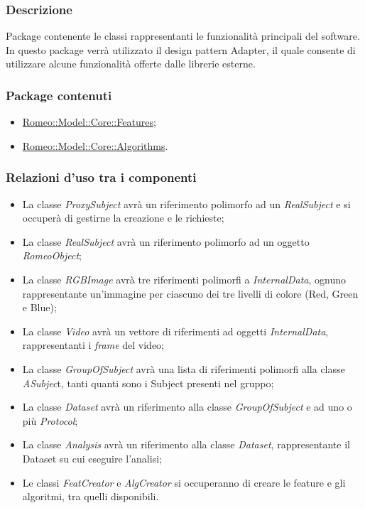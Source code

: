 		\subsubsection{Descrizione}
		Package\g{} contenente le classi rappresentanti le funzionalità principali del software. In questo package\g{} verrà utilizzato il design pattern\g{} Adapter, il quale consente di utilizzare alcune funzionalità offerte dalle librerie esterne.
		\subsubsection{Package contenuti}
		\begin{itemize}
				\item \hyperref[romeo::model::core::features]{Romeo::Model::Core::Features};
				\item \hyperref[romeo::model::core::algorithms]{Romeo::Model::Core::Algorithms}.
		\end{itemize}
		
		\subsubsection{Relazioni d'uso tra i componenti}
		\begin{itemize}
			\item La classe \textsl{ProxySubject} avrà un riferimento polimorfo ad un \textsl{RealSubject} e si occuperà di gestirne la creazione e le richieste;
			
			\item La classe \textsl{RealSubject} avrà un riferimento polimorfo ad un oggetto \textsl{RomeoObject};
			 
			\item La classe \textsl{RGBImage} avrà tre riferimenti polimorfi a \textsl{InternalData}, ognuno rappresentante un'immagine per ciascuno dei tre livelli di colore (Red, Green e Blue);
			
			\item La classe \textsl{Video} avrà un vettore di riferimenti ad oggetti \textsl{InternalData}, rappresentanti i \emph{frame} del video;
			
			\item La classe \textsl{GroupOfSubject} avrà una lista di riferimenti polimorfi alla classe \textsl{ASubjec}t, tanti quanti sono i Subject\g{} presenti nel gruppo;
			
			\item La classe \textsl{Dataset} avrà un riferimento alla classe \textsl{GroupOfSubject} e ad uno o più \textsl{Protocol};
			
			\item La classe \textsl{Analysis} avrà un riferimento alla classe \textsl{Dataset}, rappresentante il Dataset\g{} su cui eseguire l'analisi;
			
			\item Le classi \textsl{FeatCreator} e \textsl{AlgCreator} si occuperanno di creare le feature\g{} e gli algoritmi, tra quelli disponibili.
		\end{itemize}
		
